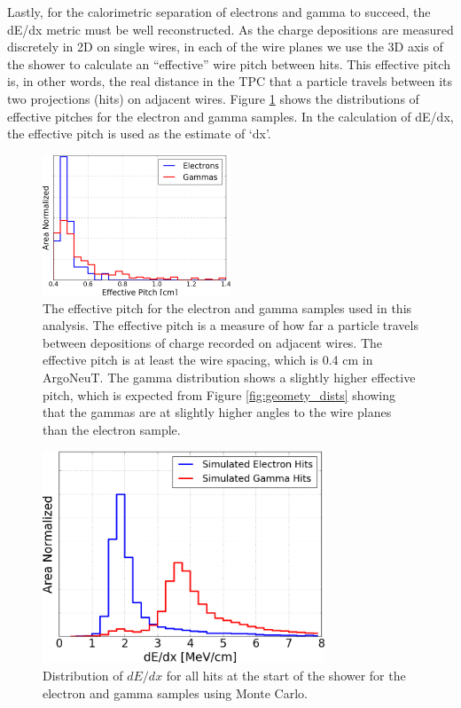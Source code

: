 Lastly, for the calorimetric separation of electrons and gamma to succeed, the dE/dx metric must be well reconstructed. As the charge depositions are measured discretely in 2D on single wires, in each of the wire planes we use the 3D axis of the shower to calculate an ``effective'' wire pitch between hits.  This effective pitch is, in other words, the real distance in the TPC that a particle travels between its two projections (hits) on adjacent wires. Figure \ref{fig:effective_pitch} shows the distributions of effective pitches for the electron and gamma samples.  In the calculation of dE/dx, the effective pitch is used as the estimate of `dx'.

\begin{figure}[htbp]
  \centering
  \includegraphics[width=0.5\textwidth]{emshower_figures/effective_pitch_trimmed.png}
  \caption[Effective Pitch]{The effective pitch for the electron and gamma samples used in this analysis.  The effective pitch is a measure of how far a particle travels between depositions of charge recorded on adjacent wires.  The effective pitch is at least the wire spacing, which is 0.4 cm in ArgoNeuT.  The gamma distribution shows a slightly higher effective pitch, which is expected from Figure \ref{fig:geomety_dists} showing that the gammas are at slightly higher angles to the wire planes than the electron sample.}
  \label{fig:effective_pitch}
\end{figure}

\begin{figure}[htb]
  \centering
  \includegraphics[width=0.75\textwidth]{emshower_figures/mcLandaus_trimmed.png}
  \caption{Distribution of $dE/dx$ for all hits at the start of the shower for the electron and gamma samples using Monte Carlo.}
  \label{fig:mc_landaus}
 \end{figure} 

